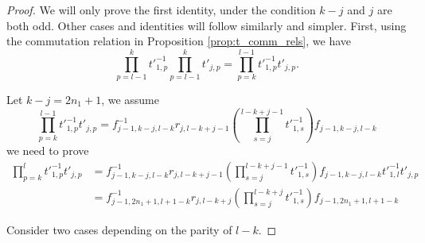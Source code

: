 \documentclass{amsart}
\begin{document}
\begin{proof}
We will only prove the first identity, under the condition $k-j$ and $j$ are both odd. Other cases and identities will follow similarly and simpler. First, using the commutation relation in Proposition \ref{prop:t_comm_rels}, we have 
\[
\prod^{k}_{p=l-1}t'^{-1}_{1,p}\prod^{k}_{p=l-1}t'_{j,p}=\prod^{l-1}_{p=k}t'^{-1}_{1,p}t'_{j,p}.   
\]

Let $k-j=2n_1+1$, we assume  
\[
 \prod^{l-1}_{p=k}t'^{-1}_{1,p}t'_{j,p}=f^{-1}_{j-1,k-j,l-k}r_{j,l-k+j-1}(\prod^{l-k+j-1}_{s=j} t'^{-1}_{1,s})f_{j-1,k-j,l-k}
\]
we need to prove 
\[
\begin{aligned}
\prod^{l}_{p=k}t'^{-1}_{1,p}t'_{j,p}&=f^{-1}_{j-1,k-j,l-k}r_{j,l-k+j-1}(\prod^{l-k+j-1}_{s=j} t'^{-1}_{1,s})f_{j-1,k-j,l-k}t'^{-1}_{1,l}
t'_{j,p}\\
&=f^{-1}_{j-1,2n_1+1,l+1-k}r_{j,l-k+j}(\prod^{l-k+j}_{s=j} t'^{-1}_{1,s})f_{j-1,2n_1+1,l+1-k}
\end{aligned}
\]

Consider two cases depending on the parity of $l-k$.


\end{proof}
\end{document}
